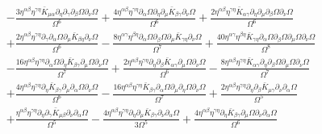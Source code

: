 \documentclass[10pt,letterpaper]{article}
\begin{document}
\begin{align}
&-  \frac{3 \eta^{\alpha \beta} \eta^{\gamma \eta} \bar{K}_{\mu \alpha} \partial_{\eta}\partial_{\gamma}\partial_{\beta}\Omega \partial_{\nu}\Omega}{\Omega^6} + \frac{4 \eta^{\alpha \beta} \eta^{\gamma \eta} \partial_{\alpha}\Omega \partial_{\eta}\partial_{\mu}\bar{K}_{\beta \gamma} \partial_{\nu}\Omega}{\Omega^6} + \frac{2 \eta^{\alpha \beta} \eta^{\gamma \eta} \bar{K}_{\alpha \gamma} \partial_{\eta}\partial_{\mu}\partial_{\beta}\Omega \partial_{\nu}\Omega}{\Omega^6} \nonumber \\
&+ \frac{2 \eta^{\alpha \beta} \eta^{\gamma \eta} \partial_{\gamma}\partial_{\alpha}\Omega \partial_{\mu}\bar{K}_{\beta \eta} \partial_{\nu}\Omega}{\Omega^6} -  \frac{8 \eta^{\alpha \gamma} \eta^{\beta \eta} \partial_{\alpha}\Omega \partial_{\beta}\Omega \partial_{\mu}\bar{K}_{\gamma \eta} \partial_{\nu}\Omega}{\Omega^7} + \frac{40 \eta^{\alpha \gamma} \eta^{\beta \eta} \bar{K}_{\gamma \eta} \partial_{\alpha}\Omega \partial_{\beta}\Omega \partial_{\mu}\Omega \partial_{\nu}\Omega}{\Omega^8}\nonumber \\
& -  \frac{16 \eta^{\alpha \beta} \eta^{\gamma \eta} \partial_{\alpha}\Omega \partial_{\eta}\bar{K}_{\beta \gamma} \partial_{\mu}\Omega \partial_{\nu}\Omega}{\Omega^7} + \frac{2 \eta^{\alpha \beta} \eta^{\gamma \eta} \partial_{\eta}\partial_{\beta}\bar{K}_{\alpha \gamma} \partial_{\mu}\Omega \partial_{\nu}\Omega}{\Omega^6} -  \frac{8 \eta^{\alpha \beta} \eta^{\gamma \eta} \bar{K}_{\alpha \gamma} \partial_{\eta}\partial_{\beta}\Omega \partial_{\mu}\Omega \partial_{\nu}\Omega}{\Omega^7} \nonumber \\
&+ \frac{4 \eta^{\alpha \beta} \eta^{\gamma \eta} \partial_{\eta}\bar{K}_{\beta \gamma} \partial_{\mu}\partial_{\alpha}\Omega \partial_{\nu}\Omega}{\Omega^6} -  \frac{16 \eta^{\alpha \beta} \eta^{\gamma \eta} \bar{K}_{\beta \gamma} \partial_{\alpha}\Omega \partial_{\mu}\partial_{\eta}\Omega \partial_{\nu}\Omega}{\Omega^7} + \frac{2 \eta^{\alpha \beta} \eta^{\gamma \eta} \partial_{\eta}\partial_{\beta}\bar{K}_{\mu \gamma} \partial_{\nu}\partial_{\alpha}\Omega}{\Omega^5} \nonumber \\
&+ \frac{\eta^{\alpha \beta} \eta^{\gamma \eta} \partial_{\eta}\partial_{\gamma}\bar{K}_{\mu \beta} \partial_{\nu}\partial_{\alpha}\Omega}{\Omega^5} -  \frac{4 \eta^{\alpha \beta} \eta^{\gamma \eta} \partial_{\eta}\partial_{\mu}\bar{K}_{\beta \gamma} \partial_{\nu}\partial_{\alpha}\Omega}{3 \Omega^5} + \frac{4 \eta^{\alpha \beta} \eta^{\gamma \eta} \partial_{\eta}\bar{K}_{\beta \gamma} \partial_{\mu}\Omega \partial_{\nu}\partial_{\alpha}\Omega}{\Omega^6} \nonumber \\

\end{align}
\end{document}
